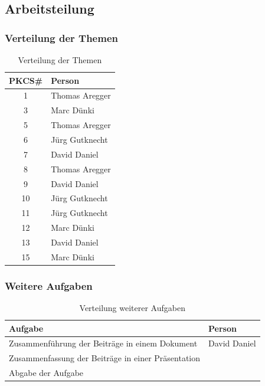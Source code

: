 \documentclass[10pt,a4paper]{article}
\begin{document}
\subsection{Arbeitsteilung}

\subsubsection{Verteilung der Themen}
\begin{table}[ht]
   \centering
   \begin{tabular}{|c|l|} \hline
      \textbf{PKCS\#} & \textbf{Person} \\\hline
      1 & Thomas Aregger \\\hline
      3 & Marc Dünki \\\hline
      5 & Thomas Aregger \\\hline
      6 & Jürg Gutknecht \\\hline
      7 & David Daniel \\\hline
      8 & Thomas Aregger \\\hline
      9 & David Daniel \\\hline
      10 & Jürg Gutknecht \\\hline
      11 & Jürg Gutknecht \\\hline
      12 & Marc Dünki \\\hline
      13 & David Daniel \\\hline
      15 & Marc Dünki \\\hline
   \end{tabular}
   \caption{Verteilung der Themen}
   \label{tab:arbeitsteilung}
\end{table}

\FloatBarrier

\subsubsection{Weitere Aufgaben}
\begin{table}[ht]
   \centering
   \begin{tabular}{|p{7.8cm}|l|} \hline
      \textbf{Aufgabe} & \textbf{Person} \\\hline
      Zusammenführung der Beiträge in einem Dokument & David Daniel \\\hline
      Zusammenfassung der Beiträge in einer Präsentation & \\\hline
      Abgabe der Aufgabe & \\\hline
   \end{tabular}
   \caption{Verteilung weiterer Aufgaben}
   \label{tab:weitere-aufgaben}
\end{table}
\end{document}
